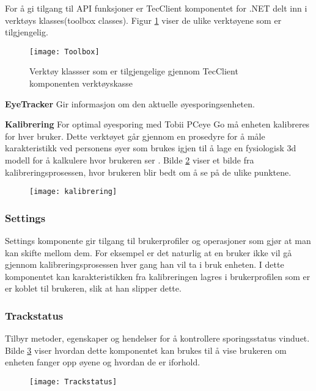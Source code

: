 For å gi tilgang til API funksjoner er TecClient komponentet for .NET delt inn i verktøys klasses(toolbox classes). Figur \ref{fig:toolbox} viser de ulike verktøyene som er tilgjengelig. 

\begin{figure}[ht!]
\centering
\texttt{[image: Toolbox]}
\caption{Verktøy klassser som er tilgjengelige gjennom TecClient komponenten verktøyskasse}
\label{fig:toolbox}
\end{figure}


\textbf{EyeTracker} Gir informasjon om den aktuelle øyesporingsenheten. 

\textbf{Kalibrering} 
For optimal øyesporing med Tobii PCeye Go må enheten kalibreres for hver bruker. Dette verktøyet går gjennom en prosedyre for å måle karakteristikk ved personens øyer som brukes igjen til å lage en fysiologisk 3d modell for å kalkulere hvor brukeren ser \cite{www.t5:online}. Bilde \ref{fig:kalibre} viser et bilde fra kalibreringsprosessen, hvor brukeren blir bedt om å se på de ulike punktene.

\begin{figure}[ht!]
\centering
\texttt{[image: kalibrering]}
\caption{ \cite{VHye88:online}}
\label{fig:kalibre}
\end{figure}


\subsubsection{Settings}
Settings komponente gir tilgang til brukerprofiler og operasjoner som gjør at man kan skifte mellom dem. For eksempel er det naturlig at en bruker ikke vil gå gjennom kalibreringsprosessen hver gang han vil ta i bruk enheten. I dette komponentet kan karakteristikken fra kalibreringen lagres i brukerprofilen som er er koblet til brukeren, slik at han slipper dette. 


\subsubsection{Trackstatus}
Tilbyr metoder, egenskaper og hendelser for å kontrollere sporingsstatus vinduet. Bilde \ref{fig:track} viser hvordan dette komponentet kan brukes til å vise brukeren om enheten fanger opp øyene og hvordan de er iforhold.

\begin{figure}[ht!]
\centering
\texttt{[image: Trackstatus]}
\caption{}
\label{fig:track}
\end{figure}

